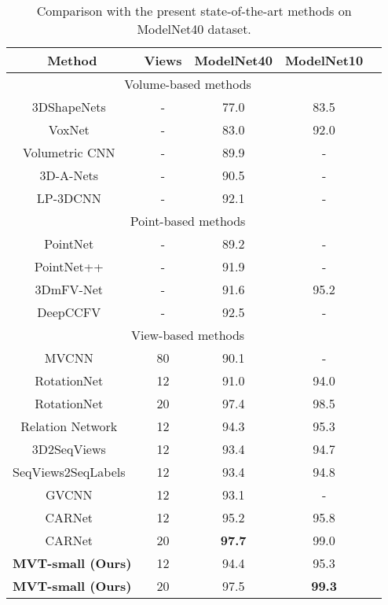 \documentclass{bmvc2k}
\begin{document}
\begin{table}[t!]
\centering
\begin{tabular}{ccccc}
\toprule
Method & Views & ModelNet40 & ModelNet10 \\
\midrule
\multicolumn{4}{c}{Volume-based methods}\\
\midrule
3DShapeNets~\cite{wu20153d} & - & 77.0 & 83.5 \\
VoxNet~\cite{maturana2015voxnet} & - & 83.0  & 92.0\\
Volumetric CNN~\cite{qi2016volumetric} & - & 89.9 &-\\
3D-A-Nets~\cite{ren20173d} & - & 90.5 & - \\
LP-3DCNN~\cite{LP-3DCNN} & - & 92.1 & - \\
\midrule
\multicolumn{4}{c}{Point-based methods}\\
\midrule
PointNet~\cite{pointnet}  & - & 89.2 & - \\
PointNet++~\cite{pointnet++}  & - & 91.9 & - \\
3DmFV-Net~\cite{3Dmfv}  & - & 91.6 & 95.2 \\
DeepCCFV~\cite{AAAI2019DeepCCFV} & - & 92.5 & - \\
\midrule
\multicolumn{4}{c}{View-based methods}\\
\midrule
MVCNN~\cite{su2015multi} & 80 & 90.1  & - \\
RotationNet~\cite{kanezaki2018rotationnet} & 12 & 91.0 & 94.0 \\
RotationNet~\cite{kanezaki2018rotationnet}& 20 & 97.4 & 98.5 \\
Relation Network~\cite{mvrelations} & 12 & 94.3 & 95.3 \\
3D2SeqViews~\cite{DBLP:journals/tip/HanLLVLZHC19} & 12 & 93.4 & 94.7 \\
SeqViews2SeqLabels~\cite{DBLP:journals/tip/HanSLVLZHC19} & 12 & 93.4 & 94.8 \\
GVCNN~\cite{feng2018gvcnn} & 12 & 93.1 & - \\
CAR\-Net~\cite{DBLP:journals/tip/XuZXQL21} & 12 & 95.2 & 95.8 \\
CAR\-Net~\cite{DBLP:journals/tip/XuZXQL21} & 20 & \textbf{97.7} & 99.0 \\
{\textbf{MVT-small (Ours)}} & 12 & 94.4 & 95.3\\
{\textbf{MVT-small (Ours)}} & 20 & 97.5  & \textbf{99.3} \\
\bottomrule
\end{tabular}

\vspace{0.1in}

\caption{
Comparison with the present state-of-the-art methods on ModelNet40 dataset.
}
\label{tab:sota}
\end{table}
\end{document}
